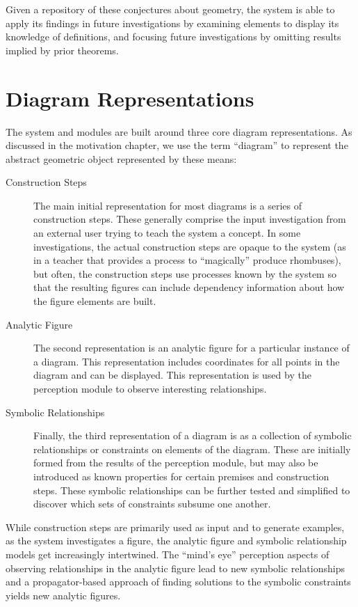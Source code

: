 Given a repository of these conjectures about geometry, the system is
able to apply its findings in future investigations by examining
elements to display its knowledge of definitions, and focusing future
investigations by omitting results implied by prior theorems.

\section{Diagram Representations}

The system and modules are built around three core diagram
representations. As discussed in the motivation chapter, we use the
term ``diagram'' to represent the abstract geometric object
represented by these means:

\begin{description}

\item[Construction Steps] The main initial representation for most
  diagrams is a series of construction steps. These generally comprise
  the input investigation from an external user trying to teach the
  system a concept. In some investigations, the actual construction
  steps are opaque to the system (as in a teacher that provides a
  process to ``magically'' produce rhombuses), but often, the
  construction steps use processes known by the system so that the
  resulting figures can include dependency information about how the
  figure elements are built.

\item[Analytic Figure] The second representation is an analytic figure
  for a particular instance of a diagram. This representation includes
  coordinates for all points in the diagram and can be displayed. This
  representation is used by the perception module to observe
  interesting relationships.

\item[Symbolic Relationships] Finally, the third representation of a
  diagram is as a collection of symbolic relationships or constraints
  on elements of the diagram. These are initially formed from the
  results of the perception module, but may also be introduced as
  known properties for certain premises and construction steps. These
  symbolic relationships can be further tested and simplified to
  discover which sets of constraints subsume one another.

\end{description}

While construction steps are primarily used as input and to generate
examples, as the system investigates a figure, the analytic figure and
symbolic relationship models get increasingly intertwined. The
``mind's eye'' perception aspects of observing relationships in the
analytic figure lead to new symbolic relationships and a
propagator-based approach of finding solutions to the symbolic
constraints yields new analytic figures.

